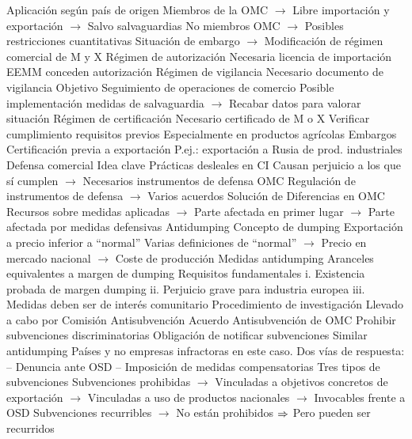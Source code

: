 \documentclass{nuevotema}
\begin{document}
\begin{esquemal}
				\4 Aplicación según país de origen
				\4[] Miembros de la OMC
				\4[] $\to$ Libre importación y exportación
				\4[] $\to$ Salvo salvaguardias
				\4[] No miembros OMC
				\4[] $\to$ Posibles restricciones cuantitativas
				\4[] Situación de embargo
				\4[] $\to$ Modificación de régimen comercial de M y X
			\3 Régimen de autorización
				\4 Necesaria licencia de importación
				\4 EEMM conceden autorización
			\3 Régimen de vigilancia
				\4 Necesario documento de vigilancia
				\4 Objetivo
				\4[] Seguimiento de operaciones de comercio
				\4[] Posible implementación medidas de salvaguardia
				\4[] $\to$ Recabar datos para valorar situación
			\3 Régimen de certificación
				\4 Necesario certificado de M o X
				\4 Verificar cumplimiento requisitos previos
				\4 Especialmente en productos agrícolas
				\4 Embargos
				\4[] Certificación previa a exportación
				\4[] P.ej.: exportación a Rusia de prod. industriales
		\2 Defensa comercial
			\3 Idea clave
				\4 Prácticas desleales en CI
				\4[] Causan perjuicio a los que sí cumplen
				\4[] $\to$ Necesarios instrumentos de defensa
				\4 OMC
				\4[] Regulación de instrumentos de defensa
				\4[] $\to$ Varios acuerdos
				\4 Solución de Diferencias en OMC
				\4[] Recursos sobre medidas aplicadas
				\4[] $\to$ Parte afectada en primer lugar
				\4[] $\to$ Parte afectada por medidas defensivas
			\3 Antidumping
				\4 Concepto de dumping
				\4[] Exportación a precio inferior a ``normal''
				\4[] Varias definiciones de ``normal''
				\4[] $\to$ Precio en mercado nacional
				\4[] $\to$ Coste de producción
				\4 Medidas antidumping
				\4[] Aranceles equivalentes a margen de dumping
				\4 Requisitos fundamentales
				\4[] i. Existencia probada de margen dumping
				\4[] ii. Perjuicio grave para industria europea
				\4[] iii. Medidas deben ser de interés comunitario
				\4 Procedimiento de investigación
				\4[] Llevado a cabo por Comisión
			\3 Antisubvención
				\4 Acuerdo Antisubvención de OMC
				\4[] Prohibir subvenciones discriminatorias
				\4[] Obligación de notificar subvenciones
				\4[] Similar antidumping
				\4[] Países y no empresas infractoras en este caso.
				\4 Dos vías de respuesta:
				\4[] -- Denuncia ante OSD
				\4[] -- Imposición de medidas compensatorias
				\4 Tres tipos de subvenciones
				\4[] Subvenciones prohibidas
				\4[] $\to$ Vinculadas a objetivos concretos de exportación
				\4[] $\to$  Vinculadas a uso de productos nacionales
				\4[] $\to$ Invocables frente a OSD
				\4[] Subvenciones recurribles
				\4[] $\to$ No están prohibidos
				\4[] $\Rightarrow$ Pero pueden ser recurridos

\end{esquemal}
\end{document}
